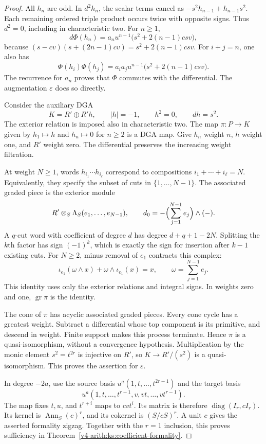 \begin{proof}
All $h_n$ are odd.
In $d^2h_n$, the scalar terms cancel as
$-s^2h_{n-1}+h_{n-1}s^2$.
Each remaining ordered triple product occurs twice with opposite signs.
Thus $d^2=0$, including in characteristic two.
For $n\geq1$,
\[
 d\Phi(h_n)=a_nu^{n-1}\bigl(s^2+2(n-1)csv\bigr),
\]
because $(s-cv)(s+(2n-1)cv)=s^2+2(n-1)csv$.
For $i+j=n$, one also has
\[
 \Phi(h_i)\Phi(h_j)=a_ia_j u^{n-1}\bigl(s^2+2(n-1)csv\bigr).
\]
The recurrence for $a_n$ proves that $\Phi$ commutes with the differential.
The augmentation $\varepsilon$ does so directly.

Consider the auxiliary DGA
\[
 K=R'\oplus R'h,\qquad |h|=-1,\qquad h^2=0,\qquad dh=s^2.
\]
The exterior relation is imposed also in characteristic two.
The map $\pi:P\to K$ given by $h_1\mapsto h$ and $h_n\mapsto0$ for $n\geq2$
is a DGA map.
Give $h_n$ weight $n$, $h$ weight one, and $R'$ weight zero.
The differential preserves the increasing weight filtration.

At weight $N\geq1$, words $h_{i_1}\cdots h_{i_\ell}$ correspond to
compositions $i_1+\cdots+i_\ell=N$.
Equivalently, they specify the subset of cuts in $\{1,\ldots,N-1\}$.
The associated graded piece is the exterior module
\[
 R'\otimes_S\Lambda_S(e_1,\ldots,e_{N-1}),
 \qquad d_0=-\Bigl(\sum_{j=1}^{N-1}e_j\Bigr)\wedge(-).
\]
A $q$-cut word with coefficient of degree $d$ has degree $d+q+1-2N$.
Splitting the $k$th factor has sign $(-1)^k$,
which is exactly the sign for insertion after $k-1$ existing cuts.
For $N\geq2$, minus removal of $e_1$ contracts this complex:
\[
 \iota_{e_1}(\omega\wedge x)+\omega\wedge\iota_{e_1}(x)=x,
 \qquad \omega=\sum_{j=1}^{N-1}e_j.
\]
This identity uses only the exterior relations and integral signs.
In weights zero and one, $\operatorname{gr}\pi$ is the identity.

The cone of $\pi$ has acyclic associated graded pieces.
Every cone cycle has a greatest weight.
Subtract a differential whose top component is its primitive, and descend in weight.
Finite support makes this process terminate.
Hence $\pi$ is a quasi-isomorphism, without a convergence hypothesis.
Multiplication by the monic element $s^2=t^{2r}$ is injective on $R'$,
so $K\to R'/(s^2)$ is a quasi-isomorphism.
This proves the assertion for $\varepsilon$.

In degree $-2a$, use the source basis
$u^a(1,t,\ldots,t^{2r-1})$ and the target basis
\[
 u^a(1,t,\ldots,t^{r-1},v,vt,\ldots,vt^{r-1}).
\]
The map fixes $t,u$, and $t^{r+i}$ maps to $cvt^i$.
Its matrix is therefore $\operatorname{diag}(I_r,cI_r)$.
Its kernel is $\operatorname{Ann}_S(c)^r$, and its cokernel is $(S/cS)^r$.
A unit $c$ gives the asserted formality zigzag.
Together with the $r=1$ inclusion, this proves sufficiency in
Theorem~\ref{v4-arith:ks:coefficient-formality}.
\end{proof}

